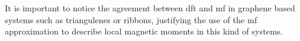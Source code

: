 It is important to notice the agreement between \acf{dft} and \acf{mf} in graphene based systems such as triangulenes or ribbons\cite{Ortiz2019,Fernandez-Rossier2007,Fernandez-Rossier2008}, justifying the use of the \ac{mf} approximation to describe local magnetic moments in this kind of systems.

%
%
